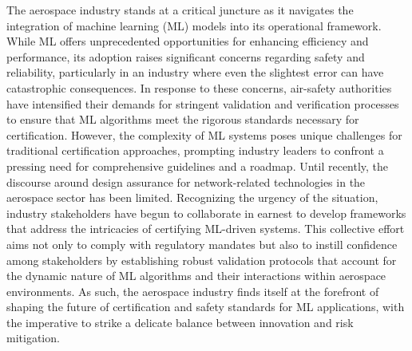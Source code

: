 \indent The aerospace industry stands at a critical juncture as it navigates the integration of machine learning (ML) models into its operational framework. While ML offers unprecedented opportunities for enhancing efficiency and performance, its adoption raises significant concerns regarding safety and reliability, particularly in an industry where even the slightest error can have catastrophic consequences. In response to these concerns, air-safety authorities have intensified their demands for stringent validation and verification processes to ensure that ML algorithms meet the rigorous standards necessary for certification. However, the complexity of ML systems poses unique challenges for traditional certification approaches, prompting industry leaders to confront a pressing need for comprehensive guidelines and a roadmap. Until recently, the discourse around design assurance for network-related technologies in the aerospace sector has been limited. Recognizing the urgency of the situation, industry stakeholders have begun to collaborate in earnest to develop frameworks that address the intricacies of certifying ML-driven systems. This collective effort aims not only to comply with regulatory mandates but also to instill confidence among stakeholders by establishing robust validation protocols that account for the dynamic nature of ML algorithms and their interactions within aerospace environments. As such, the aerospace industry finds itself at the forefront of shaping the future of certification and safety standards for ML applications, with the imperative to strike a delicate balance between innovation and risk mitigation.\\
